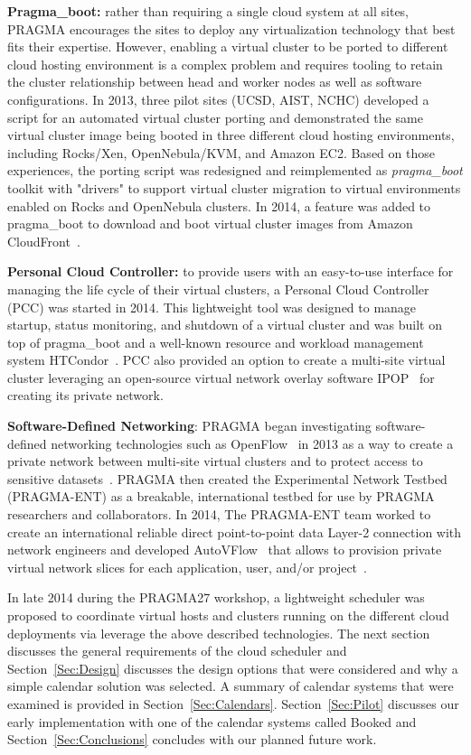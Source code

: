\documentclass{acm_proc_article-sp}
\begin{document}
\textbf{Pragma\_boot:}  rather than requiring a single cloud system at all sites, PRAGMA encourages the sites to  deploy any virtualization technology that best fits their expertise. However, enabling a virtual cluster to be ported to different cloud hosting environment is a complex problem and requires tooling to retain the cluster relationship between head and worker nodes as well as software configurations.  In 2013, three pilot sites (UCSD, AIST, NCHC) developed a script for an automated virtual cluster porting and demonstrated the same virtual cluster image being booted in three different cloud hosting environments, including Rocks/Xen, OpenNebula/KVM, and Amazon EC2.  Based on those experiences, the porting script was redesigned and reimplemented as \textit{pragma\_boot} toolkit with "drivers" to support  virtual cluster migration to virtual environments enabled on Rocks and OpenNebula clusters.  In 2014, a feature was added to pragma\_boot to download and boot virtual cluster images from Amazon CloudFront~\cite{cloudfront}.

\textbf{Personal Cloud Controller:}  to provide users with an easy-to-use interface for managing the life cycle of their virtual clusters, a Personal Cloud Controller (PCC)  was started in 2014. This lightweight tool was designed to manage startup, status monitoring, and shutdown of a virtual cluster and was built on top of pragma\_boot and a well-known resource and workload management system HTCondor~\cite{condor}.   PCC also provided an option to create a multi-site virtual cluster leveraging an open-source virtual network overlay software IPOP~\cite{ipop} for creating its private network.

\textbf{Software-Defined Networking}:   PRAGMA began investigating software-defined networking technologies such as OpenFlow~\cite{openflow} in 2013 as a way to create a private network between multi-site virtual clusters and to protect access to sensitive datasets~\cite{pragmaReport2013}.  PRAGMA then created the Experimental Network Testbed (PRAGMA-ENT) as a breakable, international testbed for use by PRAGMA researchers and collaborators.  In 2014, The PRAGMA-ENT team worked to create an international reliable direct point-to-point data Layer-2 connection with network engineers and developed AutoVFlow~\cite{autovflow} that allows to provision private virtual network slices for each application, user, and/or project~\cite{pragmaReport2014}.  

In late 2014 during the PRAGMA27 workshop, a lightweight scheduler was proposed to coordinate virtual hosts and clusters running on the different cloud deployments via leverage the above described technologies.  The next section discusses the general requirements of the cloud scheduler and Section~\ref{Sec:Design} discusses the design options that were considered and why a simple calendar solution was selected.  A summary of calendar systems that were examined is provided in Section~\ref{Sec:Calendars}.  Section~\ref{Sec:Pilot} discusses our early implementation with one of the calendar systems called Booked and Section~\ref{Sec:Conclusions} concludes with our planned future work.  
\end{document}
